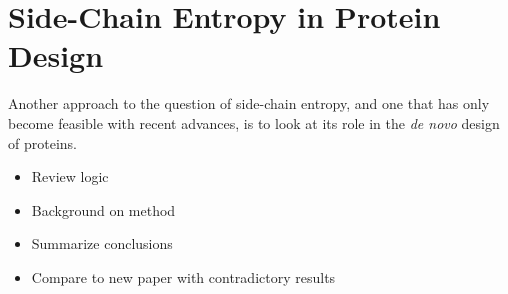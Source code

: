 \section*{Side-Chain Entropy in Protein Design}
\label{sec:side_chain_entropy_in_protein_design}
Another approach to the question of side-chain entropy, and one that has only become feasible with recent advances, is to look at its role in the \emph{de novo} design of proteins.
\begin{itemize}
	\item Review logic
	\item Background on method
	\item Summarize conclusions
	\item Compare to new paper with contradictory results
\end{itemize}
